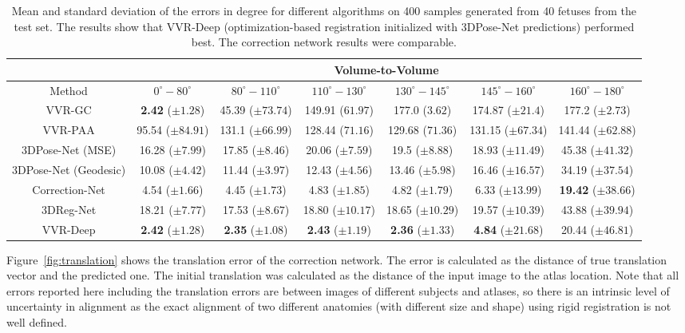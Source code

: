 \documentclass[journal,transmag]{IEEEtran}
\begin{document}
\begin{table*}[h!]
\small
\centering
 \begin{tabular}{|c||c|c|c|c|c|c|} 
 \hline
  &  \multicolumn{6}{c|}{Volume-to-Volume} \\
 \hline
Method & $0^{\circ} - 80^{\circ}$  & $80^{\circ} - 110^{\circ}$ & $110^{\circ} - 130^{\circ}$ & $130^{\circ} - 145^{\circ}$ & $145^{\circ} - 160^{\circ}$ & $160^{\circ} - 180^{\circ}$ \\
 \hline
VVR-GC & \textbf{2.42} ($\pm1.28$) & 45.39 ($\pm73.74$) & 149.91 ($61.97$)& 177.0 ($3.62$) & 174.87 ($\pm21.4$) & 177.2 ($\pm2.73$) \\ 
\hline
VVR-PAA & 95.54 ($\pm84.91$) & 131.1 ($\pm66.99$) & 128.44 ($71.16$)& 129.68 ($71.36$) & 131.15 ($\pm67.34$) & 141.44 ($\pm62.88$) \\ 
 \hline
 \color{black}
3DPose-Net (MSE) & 16.28 ($\pm7.99$) & 17.85 ($\pm8.46$) & 20.06 ($\pm7.59$)& 19.5 ($\pm8.88$) & 18.93 ($\pm11.49$) & 45.38 ($\pm41.32$) \color{black} \\ 
 \hline
 
3DPose-Net (Geodesic) & 10.08 ($\pm4.42$) & 11.44 ($\pm3.97$) & 12.43 ($\pm4.56$)& 13.46 ($\pm5.98$) & 16.46 ($\pm16.57$) & 34.19 ($\pm37.54$) \\ 
 \hline
Correction-Net & 4.54 ($\pm1.66$) & 4.45 ($\pm1.73$) & 4.83 ($\pm1.85$)& 4.82 ($\pm1.79$) & 6.33 ($\pm13.99$) & \textbf{19.42} ($\pm38.66$) \\ 
 \hline
  \color{black}
3DReg-Net & 18.21 ($\pm7.77$) & 17.53 ($\pm8.67$) & 18.80 ($\pm10.17$)& 18.65 ($\pm10.29$) & 19.57 ($\pm10.39$) & 43.88 ($\pm39.94$) \color{black} \\ 
 \hline
  
VVR-Deep & \textbf{2.42} ($\pm1.28$) & \textbf{2.35} ($\pm1.08$) & \textbf{2.43} ($\pm1.19$)& \textbf{2.36} ($\pm1.33$) & \textbf{4.84} ($\pm21.68$) & 20.44 ($\pm46.81$) \\ 
 \hline
\end{tabular}
\caption{Mean and standard deviation of the errors in degree for different algorithms on 400 samples generated from 40 fetuses from the test set. The results show that VVR-Deep (optimization-based registration initialized with 3DPose-Net predictions) performed best. The correction network results were comparable.}
\label{table:V2V}
\end{table*}

Figure~\ref{fig:translation} shows the translation error of the correction network. The error is calculated as the distance of true translation vector and the predicted one. The initial translation was calculated as the distance of the input image to the atlas location. Note that all errors reported here including the translation errors are between images of different subjects and atlases, so there is an intrinsic level of uncertainty in alignment as the exact alignment of two different anatomies (with different size and shape) using rigid registration is not well defined.%
\end{document}
